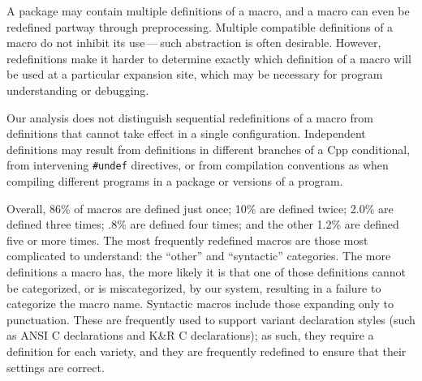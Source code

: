 \documentclass[10pt]{article}
\newcommand{\captionsmall}[1]{\caption[]{\small #1}}
\begin{document}
A package may contain multiple definitions of a macro, and a macro can even
be redefined partway through preprocessing.  Multiple compatible
definitions of a macro do not inhibit its use\,---\,such abstraction is
often desirable.  However, redefinitions make it harder to determine
exactly which definition of a macro will be used at a particular expansion
site, which may be necessary for program understanding or debugging.

Our analysis does not distinguish sequential redefinitions of a macro from
definitions that cannot take effect in a single configuration.
Independent definitions may result from definitions in different branches
of a Cpp conditional, from intervening {\tt \#undef} directives, or from
compilation conventions as when compiling different programs in a package
or versions of a program.



Overall, 86\% of macros are defined just once; 10\% are defined twice;
2.0\% are defined three times; .8\% are defined four times; and the other
1.2\% are defined five or more times.
The most frequently redefined macros are those most complicated to
understand: the ``other'' and ``syntactic'' categories.  The more
definitions a macro has, the more likely it is that one of those
definitions cannot be categorized, or is miscategorized, by our system,
resulting in a failure to categorize the macro name.  Syntactic macros
include those expanding only to punctuation.  These are frequently used to
support variant declaration styles (such as ANSI C declarations and K\&R C
declarations); as such, they require a definition for each variety, and
they are frequently redefined to ensure that their
settings are correct.
\end{document}
